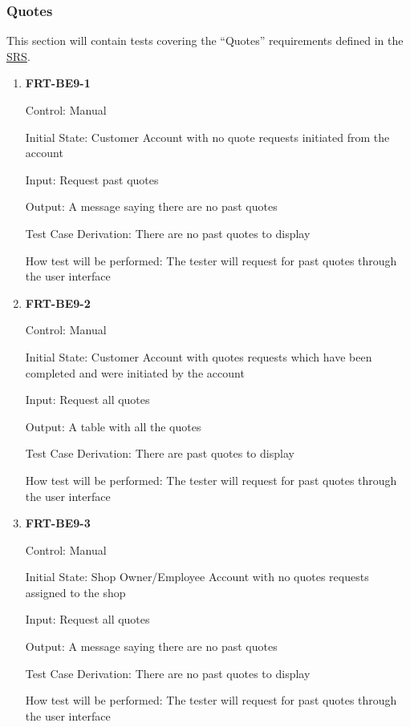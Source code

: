 \documentclass[12pt, titlepage]{article}
\begin{document}
\subsubsection{Quotes}

This section will contain tests covering the ``Quotes'' requirements defined in the
\href{https://github.com/arkinmodi/project-sayyara/blob/main/docs/SRS/SRS.pdf}{SRS}.

\begin{enumerate}
	\item \textbf{FRT-BE9-1}

	      Control: Manual

	      Initial State: Customer Account with no quote requests initiated from the account

	      Input: Request past quotes

	      Output: A message saying there are no past quotes

	      Test Case Derivation: There are no past quotes to display

	      How test will be performed: The tester will request for past quotes through the user interface

	\item \textbf{FRT-BE9-2}

	      Control: Manual

	      Initial State: Customer Account with quotes requests which have been completed and were initiated
	      by the account

	      Input: Request all quotes

	      Output: A table with all the quotes

	      Test Case Derivation: There are past quotes to display

	      How test will be performed: The tester will request for past quotes through the user interface

	\item \textbf{FRT-BE9-3}

	      Control: Manual

	      Initial State: Shop Owner/Employee Account with no quotes requests assigned to the shop

	      Input: Request all quotes

	      Output: A message saying there are no past quotes

	      Test Case Derivation: There are no past quotes to display

	      How test will be performed: The tester will request for past quotes through the user interface


\end{enumerate}
\end{document}
